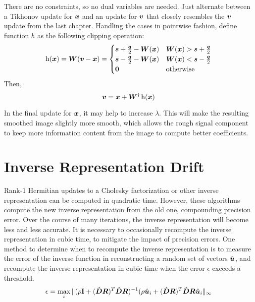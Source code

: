 There are no constraints, so no dual variables are needed. Just alternate between a Tikhonov update for $\bm{x}$ and an update for $\bm{v}$ that closely resembles the $\bm{v}$ update from the last chapter.
Handling the cases in pointwise fashion, define function $h$ as the following clipping operation:
%
\begin{equation}
\operatorname{h}(\bm{x}) = \bm{W}(\bm{v} - \bm{x}) = \begin{cases} \bm{s} + \frac{\bm{q}}{2} - \bm{W}(\bm{x}) & \bm{W}(\bm{x}) > \bm{s} + \frac{\bm{q}}{2} \\ \bm{s} - \frac{\bm{q}}{2} - \bm{W}(\bm{x}) & \bm{W}(\bm{x}) < \bm{s} - \frac{\bm{q}}{2} \\ \bm{0} & \text{otherwise}
\end{cases}
\end{equation}
%
Then,
\begin{equation}
\bm{v} = \bm{x} + \bm{W}^{\dagger}\operatorname{h}(\bm{x})
\end{equation}

In the final update for $\bm{x}$, it may help to increase $\lambda$. This will make the resulting smoothed image slightly more smooth, which allows the rough signal component to keep more information content from the image to compute better coefficients.

\section{Inverse Representation Drift}
Rank-$1$ Hermitian updates to a Cholesky factorization or other inverse representation can be computed in quadratic time. However, these algorithms compute the new inverse representation from the old one, compounding precision error. Over the course of many iterations, the inverse representation will become less and less accurate. It is necessary to occasionally recompute the inverse representation in cubic time, to mitigate the impact of precision errors.  One method to determine when to recompute the inverse representation is to measure the error of the inverse function in reconstructing a random set of vectors $\hat{\bm{u}}$, and recompute the inverse representation in cubic time when the error $\epsilon$ exceeds a threshold.
%
\begin{equation}
\epsilon = \max_i \|(\rho{\bf I} + (\hat{\bm{D}}\bm{R})^T\hat{\bm{D}}\bm{R})^{-1}(\rho\hat{\bm{u}}_i + (\hat{\bm{D}}\bm{R})^T\hat{\bm{D}}\bm{R}\hat{\bm{u}}_i\|_{\infty}
\end{equation} 

